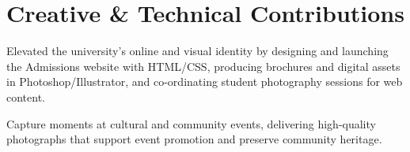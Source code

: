 \section{Creative \& Technical Contributions}
\begin{sectionContainer}
	Elevated the university's online and visual identity by designing and launching the Admissions website with HTML/CSS, producing brochures and digital assets in Photoshop/Illustrator, and co-ordinating student photography sessions for web content.
\end{sectionContainer}

\begin{sectionContainer}
	Capture moments at cultural and community events, delivering high-quality photographs that support event promotion and preserve community heritage.
\end{sectionContainer}

\nopagebreak[4]